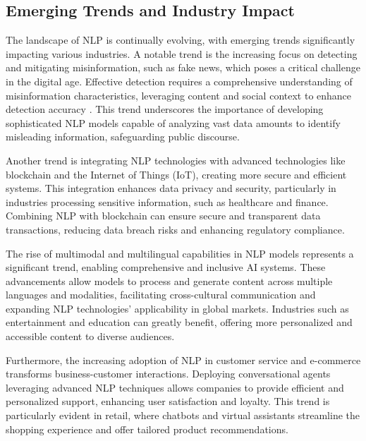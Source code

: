 \subsection{Emerging Trends and Industry Impact} \label{subsec:Emerging Trends and Industry Impact}

The landscape of NLP is continually evolving, with emerging trends significantly impacting various industries. A notable trend is the increasing focus on detecting and mitigating misinformation, such as fake news, which poses a critical challenge in the digital age. Effective detection requires a comprehensive understanding of misinformation characteristics, leveraging content and social context to enhance detection accuracy \cite{shu2017fakenewsdetectionsocial}. This trend underscores the importance of developing sophisticated NLP models capable of analyzing vast data amounts to identify misleading information, safeguarding public discourse.

Another trend is integrating NLP technologies with advanced technologies like blockchain and the Internet of Things (IoT), creating more secure and efficient systems. This integration enhances data privacy and security, particularly in industries processing sensitive information, such as healthcare and finance. Combining NLP with blockchain can ensure secure and transparent data transactions, reducing data breach risks and enhancing regulatory compliance.

The rise of multimodal and multilingual capabilities in NLP models represents a significant trend, enabling comprehensive and inclusive AI systems. These advancements allow models to process and generate content across multiple languages and modalities, facilitating cross-cultural communication and expanding NLP technologies' applicability in global markets. Industries such as entertainment and education can greatly benefit, offering more personalized and accessible content to diverse audiences.

Furthermore, the increasing adoption of NLP in customer service and e-commerce transforms business-customer interactions. Deploying conversational agents leveraging advanced NLP techniques allows companies to provide efficient and personalized support, enhancing user satisfaction and loyalty. This trend is particularly evident in retail, where chatbots and virtual assistants streamline the shopping experience and offer tailored product recommendations.









